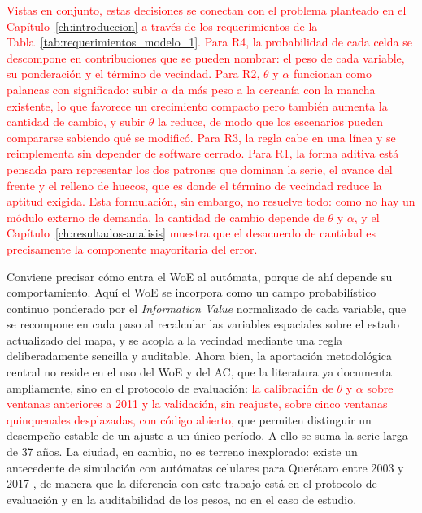 
\textcolor{red}{Vistas en conjunto, estas decisiones se conectan con el
problema planteado en el Capítulo~\ref{ch:introduccion} a través de los
requerimientos de la Tabla~\ref{tab:requerimientos_modelo_1}. Para R4, la
probabilidad de cada celda se descompone en contribuciones que se pueden
nombrar: el peso de cada variable, su ponderación y el término de vecindad.
Para R2, $\theta$ y $\alpha$ funcionan como palancas con significado: subir
$\alpha$ da más peso a la cercanía con la mancha existente, lo que favorece un
crecimiento compacto pero también aumenta la cantidad de cambio, y subir
$\theta$ la reduce, de modo que los escenarios pueden
compararse sabiendo qué se modificó. Para R3, la regla cabe en una línea y se
reimplementa sin depender de software cerrado. Para R1, la forma aditiva
está pensada para representar los dos patrones que dominan la serie, el
avance del frente y el relleno de huecos, que es donde el término de vecindad
reduce la aptitud exigida. Esta formulación, sin embargo, no resuelve
todo: como no hay un módulo externo de demanda, la cantidad de cambio depende
de $\theta$ y $\alpha$, y el Capítulo~\ref{ch:resultados-analisis} muestra
que el desacuerdo de cantidad es precisamente la componente mayoritaria del
error.}


Conviene precisar cómo entra el WoE al autómata, porque de ahí depende su comportamiento. Aquí el WoE se incorpora como un campo probabilístico continuo ponderado por el \textit{Information Value} normalizado de cada variable, que se recompone en cada paso al recalcular las variables espaciales sobre el estado actualizado del mapa, y se acopla a la vecindad mediante una regla deliberadamente sencilla y auditable. Ahora bien, la aportación metodológica central no reside en el uso del WoE y del AC, que la literatura ya documenta ampliamente, sino en el protocolo de evaluación: \textcolor{red}{la calibración de $\theta$ y $\alpha$ sobre ventanas anteriores a 2011 y la validación, sin reajuste, sobre cinco ventanas quinquenales desplazadas, con código abierto,} que permiten distinguir un desempeño estable de un ajuste a un único período. A ello se suma la serie larga de 37 años. La ciudad, en cambio, no es terreno inexplorado: existe un antecedente de simulación con autómatas celulares para Querétaro entre 2003 y 2017 \parencite{JimenezLopez2018}, de manera que la diferencia con este trabajo está en el protocolo de evaluación y en la auditabilidad de los pesos, no en el caso de estudio.

